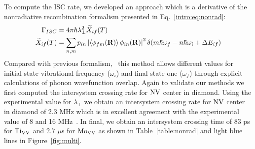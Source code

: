 To compute the ISC rate, we developed an approach which is a derivative of the nonradiative recombination formalism presented in Eq.~\ref{intro:eq:nonrad}:
\begin{align}
    \Gamma_{ISC} &= 4 \pi \hbar \lambda_\perp^2 \widetilde{X}_{if}(T) \label{eq:isc-full}\\
    \widetilde{X}_{if}(T) &= \sum_{n,m}p_{in} \left|
        \braket{\phi_{fm}(\textbf{R})}{\phi_{in}(\mathbf{R})}
    \right|^2 \delta(m\hbar\omega_f - n\hbar\omega_i+\Delta E_{if}) \label{eq:isc-F}
\end{align}
Compared with previous formalism,~\cite{thiering2017ab} this method
allows different values for initial state vibrational frequency ($\omega_i$) and final state one ($\omega_f$) through explicit calculations of phonon wavefunction overlap. Again to validate our methods we first computed the intersystem crossing rate for $\text{NV}$ center in diamond. Using the experimental value for $\lambda_\perp$ we obtain an intersystem crossing rate for $\text{NV}$ center in diamond of 2.3 MHz which is in excellent agreement with the experimental value of 8 and 16 MHz~\cite{goldman2015phonon}.
In final, we obtain an intersystem crossing time of 83 ps for $\text{Ti}_{\text{V}\text{V}}$ and 2.7 $\mu$s for $\text{Mo}_{\text{V}\text{V}}$ as shown in Table~\ref{table:nonrad} and light blue lines in Figure~\ref{fig:multi}.

